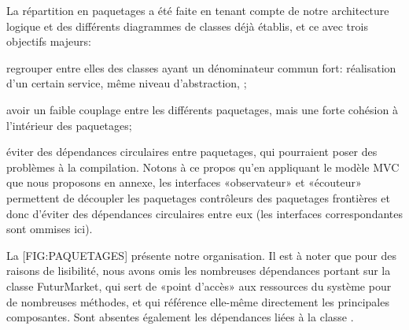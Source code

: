 La répartition en paquetages a été faite en tenant compte de notre architecture logique et des différents diagrammes de classes déjà établis, et ce avec trois objectifs majeurs:

\startitemize[n]
\item regrouper entre elles des classes ayant un dénominateur commun fort: réalisation d'un certain service, même niveau d'abstraction, \etc;
\item avoir un faible couplage entre les différents paquetages, mais une forte cohésion à l'intérieur des paquetages;
\item éviter des dépendances circulaires entre paquetages, qui pourraient poser des problèmes à la compilation. 
    Notons à ce propos qu'en appliquant le modèle MVC que nous proposons en annexe, les interfaces «observateur» et «écouteur» permettent de découpler les paquetages contrôleurs des paquetages frontières et donc d'éviter des dépendances circulaires entre eux (les interfaces correspondantes sont ommises ici).
\stopitemize

La [FIG:PAQUETAGES] présente notre organisation.
Il est à noter que pour des raisons de lisibilité, nous avons omis les nombreuses dépendances portant sur la classe FuturMarket, qui sert de «point d'accès» aux ressources du système pour de nombreuses méthodes, et qui référence elle-même directement les principales composantes. Sont absentes également les dépendances liées à la classe .

